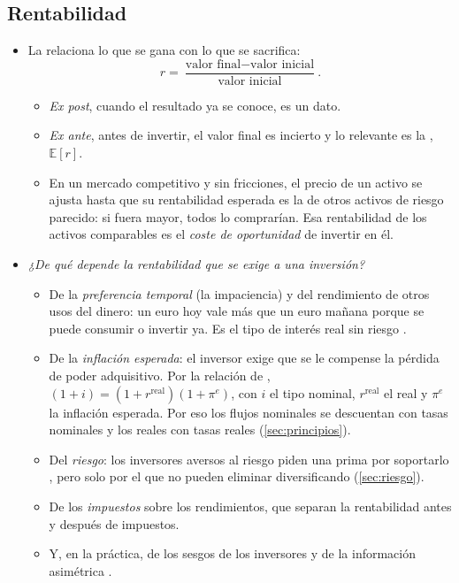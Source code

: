 \documentclass[11pt]{article}
\begin{document}
\subsection{Rentabilidad}\label{sec:rentabilidad}

\begin{itemize}
\item La  relaciona lo que se gana con lo que se sacrifica:
  \[
  r=\frac{\text{valor final}-\text{valor inicial}}{\text{valor inicial}}.
  \]
  \begin{itemize}
  \item \emph{Ex post}, cuando el resultado ya se conoce, es un dato.
  \item \emph{Ex ante}, antes de invertir, el valor final es incierto y lo relevante es la , $\mathbb{E}[r]$.
  \item En un mercado competitivo y sin fricciones, el precio de un activo se ajusta hasta que su rentabilidad esperada es la de otros activos de riesgo parecido: si fuera mayor, todos lo comprarían. Esa rentabilidad de los activos comparables es el \emph{coste de oportunidad} de invertir en él.
  \end{itemize}
\item \emph{¿De qué depende la rentabilidad que se exige a una inversión?}
  \begin{itemize}
  \item De la \emph{preferencia temporal} (la impaciencia) y del rendimiento de otros usos del dinero: un euro hoy vale más que un euro mañana porque se puede consumir o invertir ya. Es el tipo de interés real sin riesgo .
  \item De la \emph{inflación esperada}: el inversor exige que se le compense la pérdida de poder adquisitivo. Por la relación de , $(1+i)=(1+r^{\mathrm{real}})(1+\pi^{e})$, con $i$ el tipo nominal, $r^{\mathrm{real}}$ el real y $\pi^{e}$ la inflación esperada\nocite{Fisher1930Theory}. Por eso los flujos nominales se descuentan con tasas nominales y los reales con tasas reales (\ref{sec:principios}).
  \item Del \emph{riesgo}: los inversores aversos al riesgo piden una prima por soportarlo , pero solo por el que no pueden eliminar diversificando (\ref{sec:riesgo}).
  \item De los \emph{impuestos} sobre los rendimientos, que separan la rentabilidad antes y después de impuestos.
  \item Y, en la práctica, de los sesgos de los inversores y de la información asimétrica .
  \end{itemize}
\end{itemize}
\end{document}
